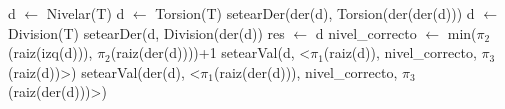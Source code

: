 \begin{algorithm}
\begin{algorithmic}[0]
	\EndIf
	\State d $\gets$ Nivelar(T) 
	\State d $\gets$ Torsion(T) 
	 
		\State setearDer(der(d), Torsion(der(der(d))) 
	\EndIf
	\State d $\gets$ Division(T) 
	\State setearDer(d, Division(der(d)) 
	\State res $\gets$ d 
\EndFunction
{}
	\State nivel\_correcto $\gets$ min($\pi_2$(raiz(izq(d))), $\pi_2$(raiz(der(d))))+1 
	 
		\State setearVal(d, <$\pi_1$(raiz(d)), nivel\_correcto, $\pi_3$(raiz(d))>) 
		 
			\State setearVal(der(d), <$\pi_1$(raiz(der(d))), nivel\_correcto, $\pi_3$(raiz(der(d)))>) 
		\EndIf
	\EndIf
\EndProcedure
\end{algorithmic}
\end{algorithm}


